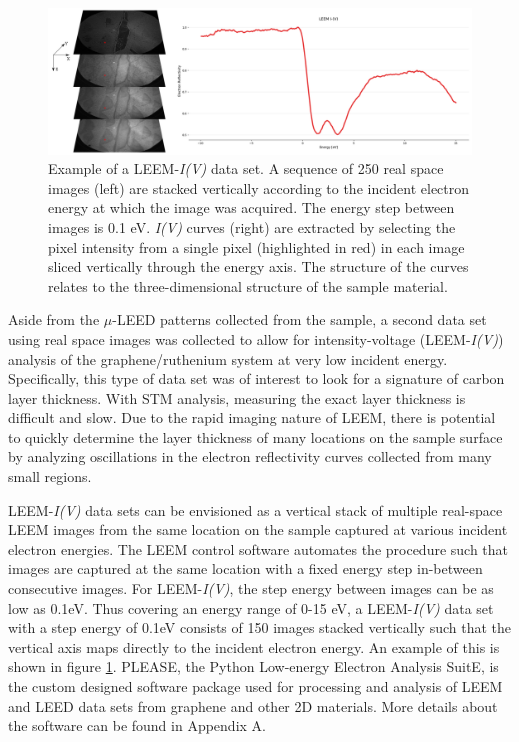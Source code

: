 \begin{figure}
  \centering
  \includegraphics[scale=0.55]{./figs/IVDiagram.png}
   \caption{
  Example of a LEEM-\textit{I(V)} data set. A sequence of 250 real space images (left) are stacked vertically according to the incident electron energy at which the image was acquired. The energy step between images is 0.1 eV. \textit{I(V)} curves (right) are extracted by selecting the pixel intensity from a single pixel (highlighted in red) in each image sliced vertically through the energy axis. The structure of the curves relates to the three-dimensional structure of the sample material.
  }
  \label{fig:LEEM-I(V)-Example}
\end{figure}

Aside from the $\mu$-LEED patterns collected from the sample, a second data set using real space images was collected to allow for intensity-voltage (LEEM-\textit{I(V)}) analysis of the graphene/ruthenium system at very low incident energy. Specifically, this type of data set was of interest to look for a signature of carbon layer thickness. With STM analysis, measuring the exact layer thickness is difficult and slow. Due to the rapid imaging nature of LEEM, there is potential to quickly determine the layer thickness of many locations on the sample surface by analyzing oscillations in the electron reflectivity curves collected from many small regions.


LEEM-\textit{I(V)} data sets can be envisioned as a vertical stack of multiple real-space LEEM images from the same location on the sample captured at various incident electron energies. The LEEM control software automates the procedure such that images are captured at the same location with a fixed energy step in-between consecutive images. For LEEM-\textit{I(V)}, the step energy between images can be as low as 0.1eV. Thus covering an energy range of 0-15 eV, a LEEM-\textit{I(V)} data set with a step energy of 0.1eV consists of 150 images stacked vertically such that the vertical axis maps directly to the incident electron energy. An example of this is shown in figure \ref{fig:LEEM-I(V)-Example}. PLEASE, the Python Low-energy Electron Analysis SuitE, is the custom designed software package used for processing and analysis of LEEM and LEED data sets from graphene and other 2D materials. More details about the software can be found in Appendix A.

